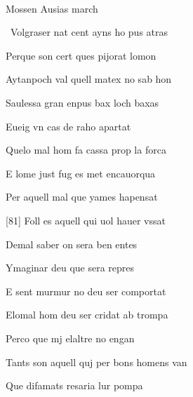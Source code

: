 \documentclass[12pt]{article}
\renewcommand{\espaiAbansEtiquetaPoema}{\vspace{0ex}}
\begin{document}
\begin{estrofa}

\espaiAbansEtiquetaPoema

\\

\begin{rubrica}

\textsection{} Mossen Ausias march \textsection{}

\end{rubrica}

\end{estrofa}


\begin{estrofa}

 \textparagraph\  Volgraser nat cent ayns ho pus atras

 Perque son cert ques pijorat lomon

 Aytanpoch val quell matex no sab hon

 Saulessa gran enpus bax loch baxas

 Eueig vn cas de raho apartat

 Quelo mal hom fa cassa prop la forca

 E lome just fug es met encauorqua

 Per aquell mal que yames hapensat

\end{estrofa}



\begin{estrofa}

 [81] Foll es aquell qui uol hauer vssat

 Demal saber on sera ben entes

 Ymaginar deu que sera repres

 E sent murmur no deu ser comportat

 Elomal hom deu ser cridat ab trompa

 Perco que mj elaltre no engan

 Tants son aquell quj per bons homens van

 Que difamats resaria lur pompa

\end{estrofa}
\end{document}

